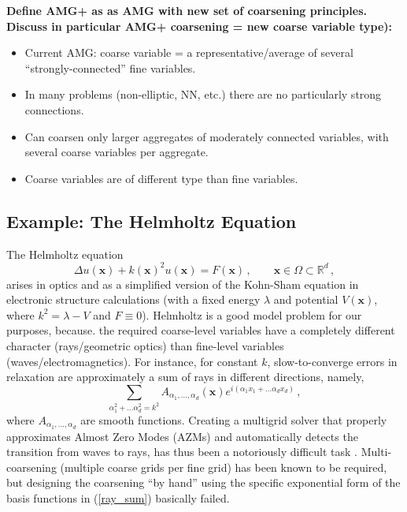 \documentclass{article}
\newcommand{\bx}{\boldsymbol x}
\newcommand{\R}{\mathbb{R}}
\begin{document}
{\bf Define AMG+ as as AMG with new set of coarsening principles. Discuss in particular AMG+ coarsening = new coarse variable type):
\begin{itemize}
\item Current AMG: coarse variable = a representative/average of several ``strongly-connected'' fine variables.
\item In many problems (non-elliptic, NN, etc.) there are no particularly strong connections.
\item Can coarsen only larger aggregates of moderately connected variables, with several coarse variables per aggregate.
\item Coarse variables are of different type than fine variables.
\end{itemize}
}


\subsection{Example: The Helmholtz Equation}
The Helmholtz equation 
\begin{equation}
	\Delta u(\bx) + k(\bx)^2 u(\bx) = F(\bx)\,,\qquad \bx \in \Omega \subset \R^d\,,
\end{equation}
arises in optics and as a simplified version of the Kohn-Sham equation in electronic structure calculations (with a fixed energy $\lambda$ and potential $V(\bx)$, where $k^2 = \lambda - V$ and $F \equiv 0$). Helmholtz is a good model problem for our purposes, because. the required coarse-level variables have a completely different character (rays/geometric optics) than fine-level variables (waves/electromagnetics). For instance, for constant $k$, slow-to-converge errors in relaxation are approximately a sum of rays in different directions, namely,
\begin{equation}
    \sum_{\alpha_1^2 + \dots \alpha_d^2 = k^2} A_{\alpha_1,\dots,\alpha_d}(\bx) e^{i (\alpha_1 x_1 + \dots \alpha_d x_d)}\,,
    \label{ray_sum}
\end{equation}
where $A_{\alpha_1,\dots,\alpha_d}$ are smooth functions. Creating a multigrid solver that properly approximates Almost Zero Modes (AZMs) and automatically detects the transition from waves to rays, has thus been a notoriously difficult task \cite{wave_ray, later_papers}. Multi-coarsening (multiple coarse grids per fine grid) has been known to be required, but designing the coarsening ``by hand'' using the specific exponential form of the basis functions in (\ref{ray_sum}) basically failed.
\end{document}
